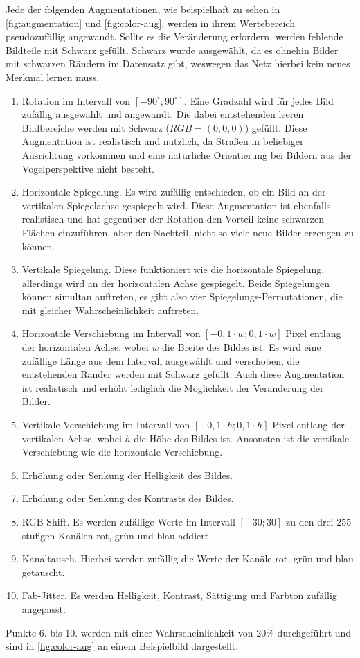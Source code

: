 Jede der folgenden Augmentationen, wie beispielhaft zu sehen in \autoref{fig:augmentation} und \autoref{fig:color-aug}, 
werden in ihrem Wertebereich pseudozufällig angewandt. 
Sollte es die Veränderung erfordern, werden fehlende Bildteile mit Schwarz gefüllt. Schwarz wurde ausgewählt, da es ohnehin Bilder mit 
schwarzen Rändern im Datensatz gibt, weswegen das Netz hierbei kein neues Merkmal lernen muss. 
\begin{enumerate}
	\item Rotation im Intervall von $[-90^\circ ; 90^\circ ]$. Eine Gradzahl wird für jedes Bild zufällig ausgewählt und angewandt. 
	Die dabei entstehenden leeren Bildbereiche werden mit Schwarz ($RGB = (0,0,0)$) gefüllt. 
	Diese Augmentation ist realistisch und nützlich, da Straßen in beliebiger Ausrichtung vorkommen und 
	eine natürliche Orientierung bei Bildern aus der Vogelperspektive nicht besteht.
	\item Horizontale Spiegelung. Es wird zufällig entschieden, ob ein Bild an der vertikalen Spiegelachse gespiegelt wird. 
	Diese Augmentation ist ebenfalls realistisch und hat gegenüber der Rotation den Vorteil keine schwarzen Flächen 
	einzuführen, aber den Nachteil, nicht so viele neue Bilder erzeugen zu können. 
	\item Vertikale Spiegelung. Diese funktioniert wie die horizontale Spiegelung, allerdings wird an der horizontalen Achse gespiegelt. 
	Beide Spiegelungen können simultan auftreten, es gibt also vier Spiegelungs-Permutationen, 
	die mit gleicher Wahrscheinlichkeit auftreten.
	\item Horizontale Verschiebung im Intervall von $[-0,1 \cdot w; 0,1 \cdot w]$ Pixel entlang der horizontalen Achse,
	wobei $w$ die Breite des Bildes ist. Es wird eine zufällige Länge aus dem Intervall ausgewählt und verschoben; die 
	entstehenden Ränder werden mit Schwarz gefüllt. Auch diese Augmentation ist realistisch und erhöht lediglich 
	die Möglichkeit der Veränderung der Bilder. 
	\item Vertikale Verschiebung im Intervall von $[-0,1 \cdot h; 0,1 \cdot h]$ Pixel entlang der vertikalen Achse,
	wobei $h$ die Höhe des Bildes ist. Ansonsten ist die vertikale Verschiebung wie die horizontale Verschiebung.  
	\item Erhöhung oder Senkung der Helligkeit des Bildes.
	\item Erhöhung oder Senkung des Kontrasts des Bildes.
	\item RGB-Shift. Es werden zufällige Werte im Intervall $[-30; 30]$ zu den drei 255-stufigen Kanälen rot, grün und blau addiert.   
	\item Kanaltausch. Hierbei werden zufällig die Werte der Kanäle rot, grün und blau getauscht. 
	\item Fab-Jitter. Es werden Helligkeit, Kontrast, Sättigung und Farbton zufällig angepasst. 
\end{enumerate} 
Punkte 6. bis 10. werden mit einer Wahrscheinlichkeit von 20\% durchgeführt und sind in \autoref{fig:color-aug} an einem Beispielbild dargestellt. 

